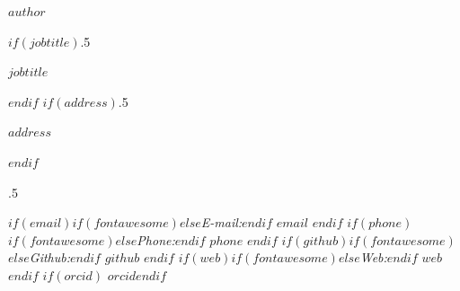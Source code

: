 
\centerline{\huge \bf $author$}

\vspace{2 mm}

\vspace{2 mm}

$if(jobtitle)$\moveleft.5\hoffset\centerline{$jobtitle$}$endif$
$if(address)$\moveleft.5\hoffset\centerline{$address$}$endif$

\vspace{1 mm}

\moveleft.5\hoffset\centerline{ 
$if(email)$$if(fontawesome)$\faEnvelopeO \hspace{1 mm}$else$\emph{E-mail:}\hspace{1 mm}$endif$ \href{mailto:$email$}{\tt $email$} \hspace{1 mm}$endif$ 
$if(phone)$$if(fontawesome)$\faPhone \hspace{1 mm}$else$\emph{Phone:}\hspace{1 mm}$endif$ $phone$ \hspace{1 mm}$endif$ 
$if(github)$$if(fontawesome)$\faGithub \hspace{1 mm}$else$\emph{Github:}\hspace{1 mm}$endif$ \href{https://github.com/$github$}{\tt $github$} \hspace{1 mm}$endif$ 
$if(web)$$if(fontawesome)$\faGlobe \hspace{1 mm}$else$\emph{Web:}\hspace{1 mm}$endif$ \href{https://$web$}{\tt $web$}$endif$ 
$if(orcid)$ \hspace{1 mm}  {\tt $orcid$}$endif$ 
}

\vspace{0 mm}
\vspace{5pt}
